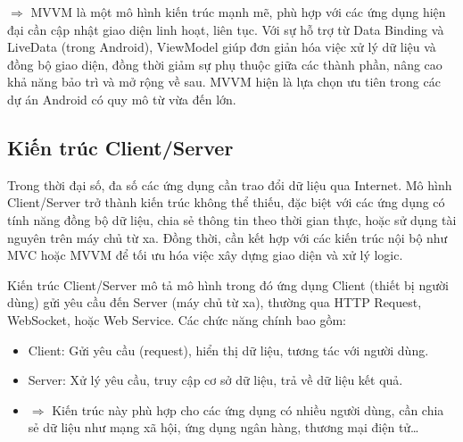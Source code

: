     \begin{flushleft}
      \hspace*{0.8cm}$\Rightarrow$ MVVM là một mô hình kiến trúc mạnh mẽ, phù hợp với các ứng dụng hiện đại cần cập nhật giao diện linh hoạt, liên tục. Với sự hỗ trợ từ Data Binding và LiveData (trong Android), ViewModel giúp đơn giản hóa việc xử lý dữ liệu và đồng bộ giao diện, đồng thời giảm sự phụ thuộc giữa các thành phần, nâng cao khả năng bảo trì và mở rộng về sau. MVVM hiện là lựa chọn ưu tiên trong các dự án Android có quy mô từ vừa đến lớn.
    \end{flushleft}

\subsection{Kiến trúc Client/Server}
\renewcommand{\labelitemi}{--}    
    \begin{flushleft}
        \hspace*{0.8cm}Trong thời đại số, đa số các ứng dụng cần trao đổi dữ liệu qua Internet. Mô hình Client/Server trở thành kiến trúc không thể thiếu, đặc biệt với các ứng dụng có tính năng đồng bộ dữ liệu, chia sẻ thông tin theo thời gian thực, hoặc sử dụng tài nguyên trên máy chủ từ xa. Đồng thời, cần kết hợp với các kiến trúc nội bộ như MVC hoặc MVVM để tối ưu hóa việc xây dựng giao diện và xử lý logic.
    \end{flushleft}

    \begin{flushleft}
      \hspace*{0.8cm}Kiến trúc Client/Server mô tả mô hình trong đó ứng dụng Client (thiết bị người dùng) gửi yêu cầu đến Server (máy chủ từ xa), thường qua HTTP Request, WebSocket, hoặc Web Service. Các chức năng chính bao gồm:
      \setlength{\leftmargini}{1.5cm}
      \begin{itemize}
          \item Client: Gửi yêu cầu (request), hiển thị dữ liệu, tương tác với người dùng.
          \item Server: Xử lý yêu cầu, truy cập cơ sở dữ liệu, trả về dữ liệu kết quả.
          \item[]$\Rightarrow$ Kiến trúc này phù hợp cho các ứng dụng có nhiều người dùng, cần chia sẻ dữ liệu như mạng xã hội, ứng dụng ngân hàng, thương mại điện tử…
      \end{itemize}
    \end{flushleft}